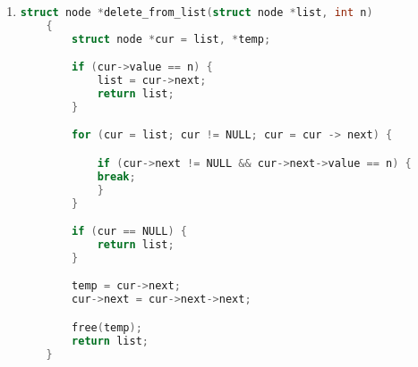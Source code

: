 \documentclass[12pt]{article}
\begin{document}
\begin{enumerate}[1.]
    \item

\begin{lstlisting}[language=c]
    struct node *delete_from_list(struct node *list, int n)
    {
        struct node *cur = list, *temp;

        if (cur->value == n) {
            list = cur->next;
            return list;
        }

        for (cur = list; cur != NULL; cur = cur -> next) {

            if (cur->next != NULL && cur->next->value == n) {
            break;
            }
        }

        if (cur == NULL) {
            return list;
        }

        temp = cur->next;
        cur->next = cur->next->next;

        free(temp);
        return list;
    }
\end{lstlisting}


\end{enumerate}
\end{document}
